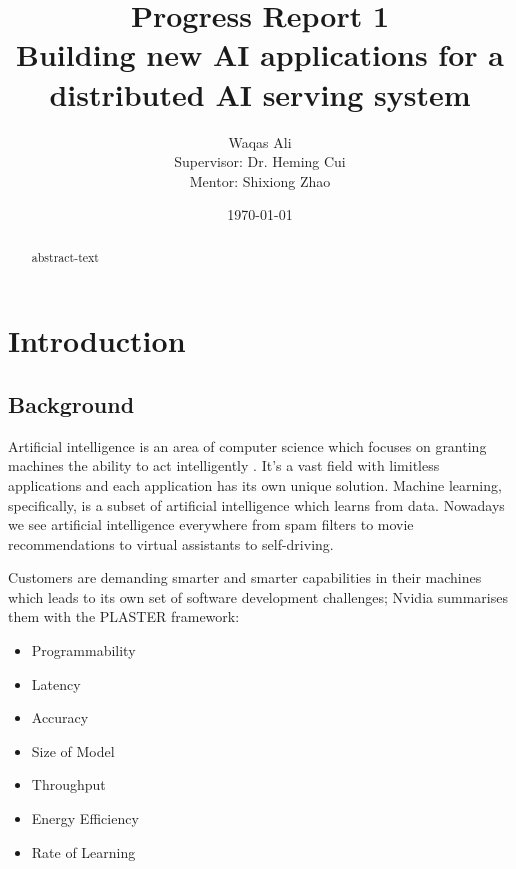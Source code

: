 \documentclass{report}
\title{Progress Report 1 \\ Building new AI applications for a distributed AI serving system}
\author{Waqas Ali\\{\small Supervisor: Dr. Heming Cui}\\{\small Mentor: Shixiong Zhao}}
\date{\today}
\def\frontmatter{%
    \pagenumbering{roman}
    \setcounter{page}{1}
    \renewcommand{\thesection}{\Roman{section}}
}%
\def\mainmatter{%
    \pagenumbering{arabic}
    \setcounter{page}{1}
    \setcounter{section}{0}
    \renewcommand{\thesection}{\thechapter.\arabic{section}}
}%
\begin{document}
\maketitle

\frontmatter

\begin{abstract}
\thispagestyle{plain}
abstract-text
\end{abstract}

\setcounter{page}{2}
\tableofcontents

\newpage
{}
\listoffigures

\newpage
{}
\listoftables

\newpage
\mainmatter

\chapter{Introduction}

\section{Background}
Artificial intelligence is an area of computer science which focuses on granting machines the ability to act intelligently \cite{McCarthy2007}. It's a vast field with limitless applications and each application has its own unique solution. Machine learning, specifically, is a subset of artificial intelligence which learns from data. \cite{Mitchell1997} Nowadays we see artificial intelligence everywhere from spam filters \cite{Androutsopoulos2000} to movie recommendations \cite{lekakos2008hybrid} to virtual assistants to self-driving.

Customers are demanding smarter and smarter capabilities in their machines which leads to its own set of software development challenges; Nvidia summarises them with the PLASTER \cite{Teich2018} framework:
\begin{itemize}
  \item Programmability
  \item Latency
  \item Accuracy
  \item Size of Model
  \item Throughput
  \item Energy Efficiency
  \item Rate of Learning
\end{itemize}
\end{document}
